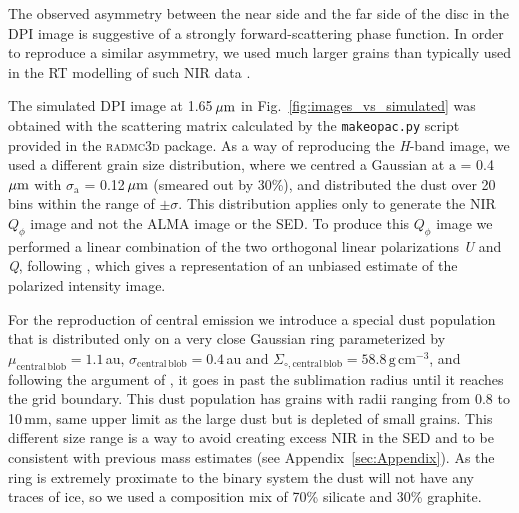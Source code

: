 \documentclass[fleqn,usenatbib,useAMS]{mnras}
\begin{document}
The observed asymmetry between the near side and the far side of the disc in the DPI image is suggestive of a strongly forward-scattering phase function. In order to reproduce a similar asymmetry, we used much larger grains than typically used in the RT modelling of such NIR data \citep[e.g.,][]{2018MNRAS.477.5104C}.

The simulated DPI image at 1.65\,$\hbox{$\mu$m}$ in Fig.~\ref{fig:images_vs_simulated} was obtained with the scattering matrix calculated by the {\tt makeopac.py} script provided in the \textsc{radmc3d} package. As a way of reproducing the \textit{H}-band image, we used a different grain size distribution, where we centred a Gaussian at $\mathrm{a}$ = 0.4\,$\hbox{$\mu$m}$ with $\sigma_{\mathrm{a}}$ = 0.12\,$\hbox{$\mu$m}$ (smeared out by 30\%), and distributed the dust over 20 bins within the range of $\pm \sigma$. This distribution applies only to generate the NIR $Q_\phi$ image and not the ALMA image or the SED. To produce this $Q_\phi$ image we performed a linear combination of the two orthogonal linear polarizations \textit{U} and \textit{Q}, following \citet{Avenhaus_2017}, which gives a representation of an unbiased estimate of the polarized intensity image.

For the reproduction of central emission we introduce a special dust population that is distributed only on a very close Gaussian ring parameterized by $\mu_{\mathrm{central\,blob}}=1.1$\,au, $\sigma_{\mathrm{central\,blob}}=0.4$\,au and $\Sigma_{\circ,\mathrm{central\,blob}}=58.8\,\mathrm{g\,cm^{-3}}$, and following the argument of \citet{Francis_2020}, it goes in past the sublimation radius until it reaches the grid boundary. This dust population has grains with radii ranging from 0.8 to 10\,mm, same upper limit as the large dust but is depleted of small grains. This different size range is a way to avoid creating excess NIR in the SED and to be consistent with previous mass estimates (see Appendix~\ref{sec:Appendix}). As the ring is extremely proximate to the binary system the dust will not have any traces of ice, so we used a composition mix of 70\% silicate and 30\% graphite.
\end{document}
